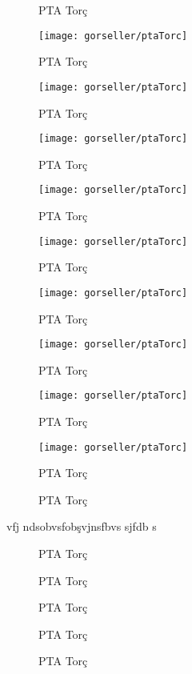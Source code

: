 \begin{figure}[h]
\caption{PTA Torç}\label{fig:PtaTorc}
\end{figure}
\begin{figure}[h]
\texttt{[image: gorseller/ptaTorc]}
\caption{PTA Torç}\label{fig:PtaTorc}
\end{figure}
\begin{figure}[h]
\texttt{[image: gorseller/ptaTorc]}
\caption{PTA Torç}\label{fig:PtaTorc}
\end{figure}
\begin{figure}[h]
\texttt{[image: gorseller/ptaTorc]}
\caption{PTA Torç}\label{fig:PtaTorc}
\end{figure}
\begin{figure}[h]
\texttt{[image: gorseller/ptaTorc]}
\caption{PTA Torç}\label{fig:PtaTorc}
\end{figure}
\begin{figure}[h]
\texttt{[image: gorseller/ptaTorc]}
\caption{PTA Torç}\label{fig:PtaTorc}
\end{figure}
\begin{figure}[h]
\texttt{[image: gorseller/ptaTorc]}
\caption{PTA Torç}\label{fig:PtaTorc}
\end{figure}\begin{figure}[h]
\texttt{[image: gorseller/ptaTorc]}
\caption{PTA Torç}\label{fig:PtaTorc}
\end{figure}
\begin{figure}[h]
\texttt{[image: gorseller/ptaTorc]}
\caption{PTA Torç}\label{fig:PtaTorc}
\end{figure}
\begin{figure}[h]
\texttt{[image: gorseller/ptaTorc]}
\caption{PTA Torç}\label{fig:PtaTorc}
\end{figure}
\begin{figure}[h]
\caption{PTA Torç}\label{fig:PtaTorc}
\end{figure}


vfj ndsobvsfobşvjnsfbvs
 sjfdb s
\lipsum 

\begin{figure}[h]
\caption{PTA Torç}\label{fig:PtaTorc}
\end{figure}
\begin{figure}[h]
\caption{PTA Torç}\label{fig:PtaTorc}
\end{figure}
\begin{figure}[h]
\caption{PTA Torç}\label{fig:PtaTorc}
\end{figure}
\begin{figure}[h]
\caption{PTA Torç}\label{fig:PtaTorc}
\end{figure}
\begin{figure}[h]
\caption{PTA Torç}\label{fig:PtaTorc}
\end{figure}

